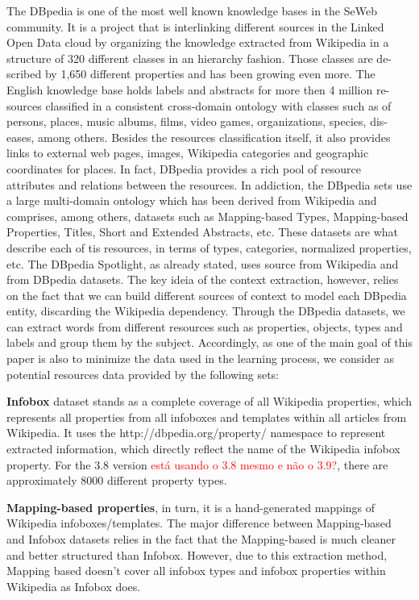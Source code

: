 \documentclass[10pt,a4paper]{article}
\begin{document}
The DBpedia \cite{swj13dbpedia} is one of the most well known knowledge bases in the SeWeb community. It is a project that is interlinking different sources in the Linked Open Data cloud by organizing the knowledge extracted from Wikipedia in a structure of 320 different classes in an hierarchy fashion. Those classes are de- scribed by 1,650 different properties and has been growing even more. The English knowledge base holds labels and abstracts for more then 4 million re- sources classified in a consistent cross-domain ontology with classes such as of persons, places, music albums, films, video games, organizations, species, dis- eases, among others. Besides the resources classification itself, it also provides links to external web pages, images, Wikipedia categories and geographic coordinates for places. In fact, DBpedia provides a rich pool of resource attributes and relations between the resources.
In addiction, the DBpedia sets use a large multi-domain ontology which has been derived from Wikipedia and comprises, among others, datasets such as Mapping-based Types, Mapping-based Properties, Titles, Short and Extended Abstracts, etc. These datasets are what describe each of tis resources, in terms of types, categories, normalized properties, etc. The DBpedia Spotlight, as already stated, uses source from Wikipedia and from DBpedia datasets.
The key ideia of the context extraction, however, relies on the fact that we can build different sources of context to model each DBpedia entity, discarding the Wikipedia dependency. Through the DBpedia datasets, we can extract words from different resources such as properties, objects, types and labels and group them by the subject. Accordingly, as one of the main goal of this paper is also to minimize the data used in the learning process, we consider as potential resources data provided by the following sets:

\textbf{Infobox} dataset stands as a complete coverage of all Wikipedia properties, which represents all properties from all infoboxes and templates within all articles from Wikipedia. It uses the http://dbpedia.org/property/  namespace  to represent extracted information, which directly reflect the name of the Wikipedia infobox property. For the 3.8 version \textcolor{red}{est\'a usando o 3.8 mesmo e n\~ao o 3.9?}, there are approximately 8000 different property types.

\textbf{Mapping-based properties}, in turn, it is a hand-generated mappings of Wikipedia infoboxes/templates. The major difference between Mapping-based and Infobox datasets relies in the fact that the Mapping-based is much cleaner and better structured than Infobox. However,  due to this extraction method, Mapping based  doesn't cover all infobox types and infobox properties within Wikipedia as Infobox does.
\end{document}
